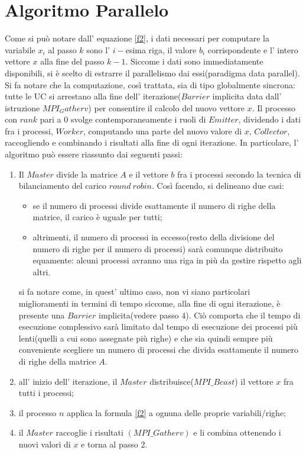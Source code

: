 \documentclass[twocolumn]{article}
\begin{document}
	\section{Algoritmo Parallelo}
	Come si può notare dall' equazione \eqref{f2}, i dati necessari per computare la variabile $x_i$ al passo $k$ sono l' $i-$esima riga, il valore $b_i$ corrispondente e l' intero vettore $x$ alla fine del passo $k-1$. Siccome i dati sono immediatamente disponibili,  si è scelto di estrarre il parallelismo dai essi(paradigma data parallel). Si fa notare che la computazione, così trattata, sia di tipo globalmente sincrona: tutte le UC si arrestano alla fine dell' iterazione($Barrier$ implicita data dall' istruzione $MPI_Gatherv$) per consentire il calcolo del nuovo vettore $x$.  Il processo con $rank$ pari a 0 svolge contemporaneamente i ruoli di $Emitter$,  dividendo i dati fra i processi, $Worker$, computando una parte del nuovo valore di $x$, $Collector$, raccogliendo e combinando i risultati alla fine di ogni iterazione. In particolare, l' algoritmo può essere riassunto dai seguenti passi:
	\begin{enumerate}
		\item Il $Master$ divide la matrice $A$ e il vettore $b$ fra i processi secondo la tecnica di bilanciamento del carico $round \ robin$. Così facendo, si delineano due casi:
		\begin{itemize}
			\item se il numero di processi divide esattamente il numero di righe della matrice, il carico è uguale per tutti;
			\item altrimenti, il numero di processi in eccesso(resto della divisione del numero di righe per il numero di processi) sarà comunque distribuito equamente: alcuni processi avranno una riga in più da gestire rispetto agli altri.
		\end{itemize}
	si fa notare come, in quest' ultimo caso, non vi siano particolari miglioramenti in termini di tempo siccome, alla fine di ogni iterazione, è presente una $Barrier$ implicita(vedere passo 4). Ciò comporta che il tempo di esecuzione complessivo sarà limitato dal tempo di esecuzione dei processi più lenti(quelli a cui sono assegnate più righe) e che sia quindi sempre più conveniente scegliere un numero di processi che divida esattamente il numero di righe della matrice $A$.
	\item all' inizio dell' iterazione, il $Master$ distribuisce($MPI\_Bcast$) il vettore $x$ fra tutti i processi;
	\item il processo $n$ applica la formula \eqref{f2} a ognuna delle proprie variabili/righe;
	\item il $Master$ raccoglie i risultati $(MPI\_Gatherv)$ e li combina ottenendo i nuovi valori di $x$ e torna al passo 2.
	\end{enumerate}
	
\end{document}
